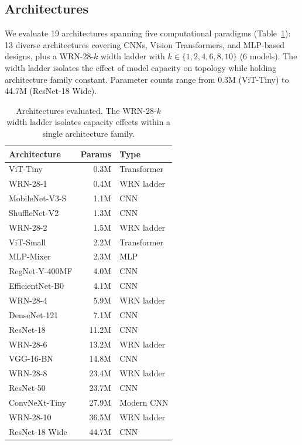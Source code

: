 \documentclass[10pt,twocolumn]{article}
\begin{document}
\subsection{Architectures}

We evaluate 19 architectures spanning five computational paradigms (Table~\ref{tab:architectures}): 13 diverse architectures covering CNNs, Vision Transformers, and MLP-based designs, plus a WRN-28-$k$ width ladder with $k \in \{1, 2, 4, 6, 8, 10\}$ (6 models). The width ladder isolates the effect of model capacity on topology while holding architecture family constant. Parameter counts range from 0.3M (ViT-Tiny) to 44.7M (ResNet-18 Wide).

\begin{table}[t]
\centering
\caption{Architectures evaluated. The WRN-28-$k$ width ladder isolates capacity effects within a single architecture family.}
\label{tab:architectures}
\small
\begin{tabular}{@{}lrl@{}}
\toprule
Architecture & Params & Type \\
\midrule
ViT-Tiny         & 0.3M  & Transformer \\
WRN-28-1         & 0.4M  & WRN ladder \\
MobileNet-V3-S   & 1.1M  & CNN \\
ShuffleNet-V2    & 1.3M  & CNN \\
WRN-28-2         & 1.5M  & WRN ladder \\
ViT-Small        & 2.2M  & Transformer \\
MLP-Mixer        & 2.3M  & MLP \\
RegNet-Y-400MF   & 4.0M  & CNN \\
EfficientNet-B0  & 4.1M  & CNN \\
WRN-28-4         & 5.9M  & WRN ladder \\
DenseNet-121     & 7.1M  & CNN \\
ResNet-18        & 11.2M & CNN \\
WRN-28-6         & 13.2M & WRN ladder \\
VGG-16-BN        & 14.8M & CNN \\
WRN-28-8         & 23.4M & WRN ladder \\
ResNet-50        & 23.7M & CNN \\
ConvNeXt-Tiny    & 27.9M & Modern CNN \\
WRN-28-10        & 36.5M & WRN ladder \\
ResNet-18 Wide   & 44.7M & CNN \\
\bottomrule
\end{tabular}
\end{table}
\end{document}
